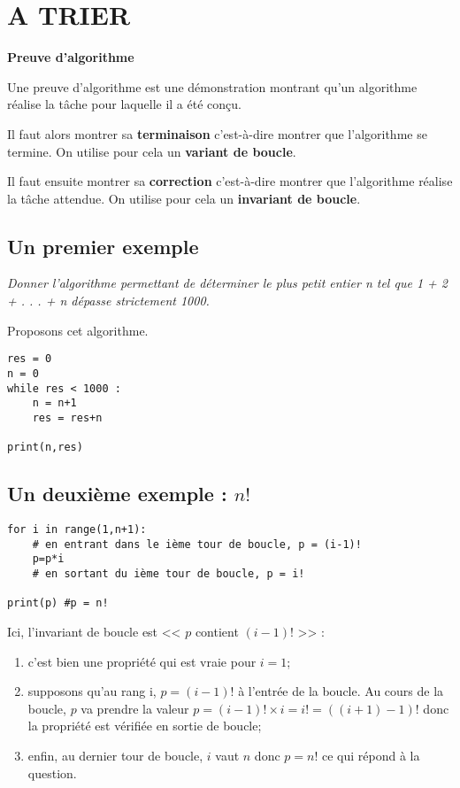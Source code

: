 \newpage
\section{A TRIER}

\begin{defi} 
\textbf{Preuve d'algorithme}

Une preuve d'algorithme est une démonstration montrant qu'un algorithme réalise la tâche pour laquelle il a été conçu. 

Il faut alors montrer sa \textbf{terminaison} c'est-à-dire montrer que l'algorithme se termine. On utilise pour cela un \textbf{variant de boucle}.

Il faut ensuite montrer sa \textbf{correction} c'est-à-dire montrer que l'algorithme réalise la tâche attendue. On utilise pour cela un \textbf{invariant de boucle}.
\end{defi}



\subsection{Un premier exemple}

\textit{Donner l'algorithme permettant de déterminer le plus petit entier n tel que 1 + 2 + . . . + n dépasse strictement 1000.}

Proposons cet algorithme.
\begin{lstlisting}
res = 0
n = 0
while res < 1000 : 
    n = n+1
    res = res+n
    
print(n,res)
\end{lstlisting}

\subsection{Un deuxième exemple : $n!$}

\begin{lstlisting}
for i in range(1,n+1):
    # en entrant dans le ième tour de boucle, p = (i-1)!
    p=p*i
    # en sortant du ième tour de boucle, p = i!

print(p) #p = n!
\end{lstlisting}

Ici, l'invariant de boucle est << $p$ contient $(i-1)!$ >> : 
\begin{enumerate}
\item c'est bien une propriété qui est vraie pour $i=1$;
\item supposons qu'au rang i, $p=(i-1)!$ à l'entrée de la boucle. Au cours de la boucle, $p$ va prendre la valeur $p=(i-1)!\times i=i!=((i+1)-1)!$ donc la propriété est vérifiée en sortie de boucle;
\item enfin, au dernier tour de boucle, $i$ vaut $n$ donc $p=n!$ ce qui répond à la question.\\
\end{enumerate}

